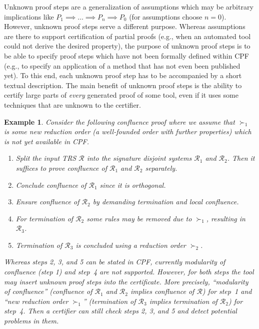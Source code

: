 \documentclass[USenglish]{eptcs}
\newcommand\RR{\ensuremath{\mathcal{R}}\xspace}
\newtheorem{example}{Example}
\begin{document}
Unknown proof steps are a generalization of assumptions which may be arbitrary
implications like $P_1 \implies \dots \implies  P_n \implies P_0$ (for
assumptions choose $n = 0$).  However, unknown proof steps serve a different
purpose. Whereas assumptions are there to support certification of partial
proofs (e.g., when an automated tool could not derive the desired property), the
purpose of unknown proof steps is to be able to specify proof steps which have
not been formally defined within CPF (e.g., to specify an application of a
method that has not even been published yet). To this end, each unknown proof
step has to be accompanied by a short textual description.  The main benefit of
unknown proof steps is the ability to certify large parts of \emph{every}
generated proof of some tool, even if it uses some techniques that are unknown
to the certifier.
\begin{example}
Consider the following confluence proof where we assume that
$\succ_1$ is some new reduction order (a well-founded order with further properties) 
which is not yet available in CPF.
\begin{enumerate}
\item
Split the input TRS $\RR$ into the signature disjoint systems $\RR_1$ and $\RR_2$.
Then it suffices to prove confluence of $\RR_1$ and $\RR_2$ separately.

\item
Conclude confluence of $\RR_1$ since it is orthogonal.

\item
Ensure confluence of $\RR_2$ by demanding termination and local confluence.

\item
For termination of $\RR_2$ some rules may be removed due to $\succ_1$, resulting
in $\RR_3$.

\item
Termination of $\RR_3$ is concluded using a reduction order $\succ_2$.
\end{enumerate}
Whereas steps 2, 3, and 5 can be stated in CPF, currently modularity of
confluence (step 1) and step~4 are not supported. However, for both steps the
tool may insert unknown proof steps into the certificate. More precisely,
``modularity of confluence'' (confluence of $\RR_1$ and $\RR_2$ implies
confluence of $\RR$) for step~1 and ``new reduction order $\succ_1$''
(termination of $\RR_3$ implies termination of $\RR_2$) for step~4. Then a
certifier can still check steps 2, 3, and 5 and detect potential problems in
them.
\end{example}
\end{document}
